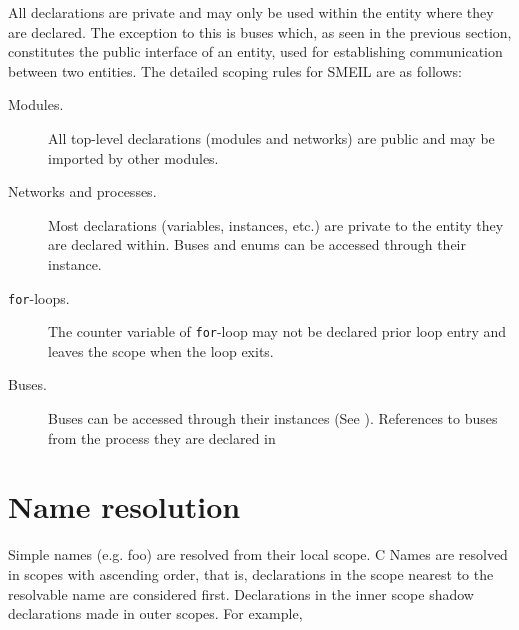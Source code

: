 All declarations are private and may only be used within the entity where they
are declared. The exception to this is buses which, as seen in the previous
section, constitutes the public interface of an entity, used for establishing
communication between two entities.
The detailed scoping
rules for SMEIL are as follows:

\begin{description}
  \item[Modules.] All top-level declarations (modules and networks) are public and
    may be imported by other modules.
  \item[Networks and processes.] Most declarations (variables, instances, etc.)
    are private to the entity they are declared within. Buses and enums can be
    accessed through their instance.
  \item[\texttt{for}-loops.] The counter variable of \texttt{for}-loop may not
    be declared prior loop entry and leaves the scope when the loop exits.
  \item[Buses.] Buses  can be
    accessed through their instances (See ). References to
    buses from the process they are declared in 
\end{description}



\section{Name resolution}
Simple names (e.g. {\ttfamily foo}) are resolved from their local scope. C
Names are resolved in scopes with ascending order, that is, declarations in the
scope nearest to the resolvable name are considered first. Declarations in the
inner scope shadow declarations made in outer scopes. For example, 

